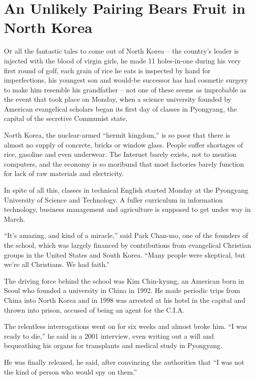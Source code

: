 ﻿\documentclass[12pt]{article}
\begin{document}
\section{An Unlikely Pairing Bears Fruit in North Korea}

\lettrine{O}{f} all the fantastic tales to come out of North Korea -- the
country's leader is injected with the blood of virgin girls, he made 11 holes-in-one during his very
first round of golf, each grain of rice he eats is inspected by hand for imperfections, his youngest
son and would-be successor has had cosmetic surgery to make him resemble his grandfather -- not one
of these seems as improbable as the event that took place on Monday, when a science university
founded by American evangelical scholars began its first day of classes in Pyongyang, the capital of
the secretive Communist state.

North Korea, the nuclear-armed ``hermit kingdom,'' is so poor that there is almost no supply of
concrete, bricks or window glass. People suffer shortages of rice, gasoline and even underwear. The
Internet barely exists, not to mention computers, and the economy is so moribund that most factories
barely function for lack of raw materials and electricity.

In spite of all this, classes in technical English started Monday at the Pyongyang University of
Science and Technology. A fuller curriculum in information technology, business management and
agriculture is supposed to get under way in March.

``It's amazing, and kind of a miracle,'' said Park Chan-mo, one of the founders of the school, which
was largely financed by contributions from evangelical Christian groups in the United States and
South Korea. ``Many people were skeptical, but we're all Christians. We had faith.''

The driving force behind the school was Kim Chin-kyung, an American born in Seoul who founded a
university in China in 1992. He made periodic trips from China into North Korea and in 1998 was
arrested at his hotel in the capital and thrown into prison, accused of being an agent for the
C.I.A.

The relentless interrogations went on for six weeks and almost broke him. ``I was ready to die,'' he
said in a 2001 interview, even writing out a will and bequeathing his organs for transplants and
medical study in Pyongyang.

He was finally released, he said, after convincing the authorities that ``I was not the kind of
person who would spy on them.''
\end{document}
